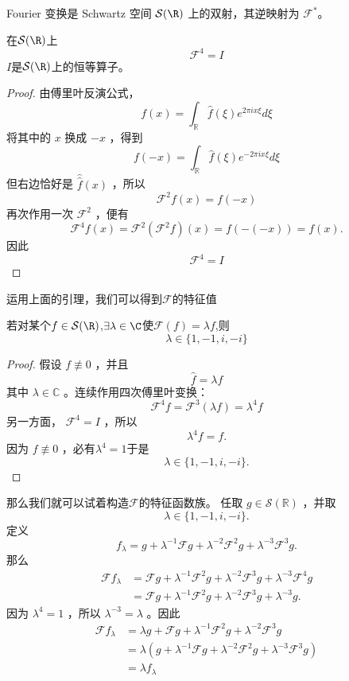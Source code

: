 \begin{proposition}\label{prop:fourier-bijection-schwartz}
	Fourier 变换是 Schwartz 空间 $\mathcal S(\R)$ 上的双射，其逆映射为 $\mathcal F^*$。
\end{proposition}
\begin{lemma}
	在$\mathcal{S}(\R)$上\[\mathcal{F}^4=I\]$I$是$\mathcal{S}(\R)$上的恒等算子。
\end{lemma}
\begin{proof}
	由傅里叶反演公式，
	$$
	f(x)=\int_{\mathbb{R}} \hat{f}(\xi) e^{2 \pi i x \xi} d \xi
	$$
	将其中的 $x$ 换成 $-x$ ，得到
	$$
	f(-x)=\int_{\mathbb{R}} \hat{f}(\xi) e^{-2 \pi i x \xi} d \xi
	$$
	但右边恰好是 $\widehat{\hat{f}}(x)$ ，所以
	$$
	\mathcal{F}^2 f(x)=f(-x)
	$$
	再次作用一次 $\mathcal{F}^2$ ，便有
	$$
	\mathcal{F}^4 f(x)=\mathcal{F}^2\left(\mathcal{F}^2 f\right)(x)=f(-(-x))=f(x) .
	$$
	因此
	$$
	\mathcal{F}^4=I
	$$
\end{proof}
运用上面的引理，我们可以得到$\mathcal{F}$的特征值
\begin{proposition}
	若对某个$f\in \mathcal{S}(\R)$,$\exists \lambda\in\C$使$\mathcal{F}(f)=\lambda f$,则\[\lambda\in\{1,-1,i,-i\}\]
\end{proposition}
\begin{proof}
	假设 $f \not \equiv 0$ ，并且
	$$
	\hat{f}=\lambda f
	$$
	其中 $\lambda \in \mathbb{C}$ 。连续作用四次傅里叶变换：
	$$
	\mathcal{F}^4 f=\mathcal{F}^3(\lambda f)=\lambda^4 f
	$$
	另一方面， $\mathcal{F}^4=I$ ，所以
	$$
	\lambda^4 f=f .
	$$
	因为 $f \not \equiv 0$ ，必有$\lambda^4=1 $于是
	$$
	\lambda \in\{1,-1, i,-i\} .
	$$
\end{proof}
那么我们就可以试着构造$\mathcal{F}$的特征函数族。
任取 $g \in \mathcal{S}(\mathbb{R})$ ，并取
$$
\lambda \in\{1,-1, i,-i\} .
$$
定义
$$
f_\lambda=g+\lambda^{-1} \mathcal{F} g+\lambda^{-2} \mathcal{F}^2 g+\lambda^{-3} \mathcal{F}^3 g .
$$
那么
$$
\begin{aligned}
	\mathcal{F} f_\lambda & =\mathcal{F} g+\lambda^{-1} \mathcal{F}^2 g+\lambda^{-2} \mathcal{F}^3 g+\lambda^{-3} \mathcal{F}^4 g \\
	& =\mathcal{F} g+\lambda^{-1} \mathcal{F}^2 g+\lambda^{-2} \mathcal{F}^3 g+\lambda^{-3} g .
\end{aligned}
$$
因为 $\lambda^4=1$ ，所以 $\lambda^{-3}=\lambda$ 。因此
$$
\begin{aligned}
	\mathcal{F} f_\lambda & =\lambda g+\mathcal{F} g+\lambda^{-1} \mathcal{F}^2 g+\lambda^{-2} \mathcal{F}^3 g \\
	& =\lambda\left(g+\lambda^{-1} \mathcal{F} g+\lambda^{-2} \mathcal{F}^2 g+\lambda^{-3} \mathcal{F}^3 g\right) \\
	& =\lambda f_\lambda
\end{aligned}
$$
